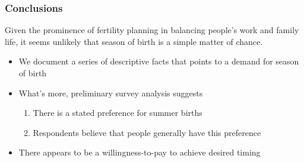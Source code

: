 \documentclass[10pt,letterpaper,subeqn]{beamer}
\begin{document}
\begin{frame}[label=conclusions]
\frametitle{Conclusions}
Given the prominence of fertility planning in balancing people's work and family life, it seems unlikely that season of birth is a simple matter of chance.
\vspace{6mm}
\begin{itemize}
\item We document a series of descriptive facts that points to a demand for season of birth
\item What's more, preliminary survey analysis suggests
  \begin{enumerate}
  \item There is a stated preference for summer births
    \item Respondents believe that people generally have this preference
  \end{enumerate}
\item There appears to be a willingness-to-pay to achieve desired timing
\end{itemize}
\end{frame}

\end{document}

